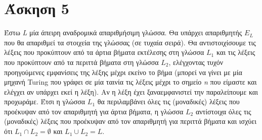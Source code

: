 \documentclass[11pt]{article}
\begin{document}

\section*{Άσκηση 5}
Έστω \textit{L} μία άπειρη αναδρομικά απαριθμήσιμη γλώσσα. Θα υπάρχει απαριθμητής $E_L$ που θα απαριθμεί τα στοιχεία της γλώσσας (σε τυχαία σειρά). Θα αντιστοιχίσουμε τις λέξεις που προκύπτουν από τα άρτια βήματα εκτέλεσης στη γλώσσα $L_1$ και τις λέξεις που προκύπτουν από τα περιττά βήματα στη γλώσσα $L_2$, ελέγχοντας τυχόν προηγούμενες εμφανίσεις της λέξης μέχρι εκείνο το βήμα (μπορεί να γίνει με μία μηχανή Turing που γράφει σε μία ταινία τις λέξεις μέχρι το σημείο \textit{n} που είμαστε και ελέγχει αν υπάρχει εκεί η λέξη). Αν η λέξη έχει ξαναεμφανιστεί την παραλείπουμε και προχωράμε. Έτσι η γλώσσα $L_1$ θα περιλαμβάνει όλες τις (μοναδικές) λέξεις που προέκυψαν από τον απαριθμητή για άρτια βήματα, η γλώσσα $L_2$ αντίστοιχα όλες τις (μοναδικές) λέξεις που προέκυψαν από τον απαριθμητή για περιττά βήματα και ισχύει ότι $L_1 \cap L_2 = \emptyset$ και $L_1 \cup L_2 = L$.




\end{document}
